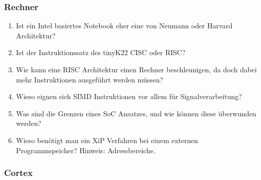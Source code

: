\documentclass[
  10pt,
  a4paper,
]{article}
\numberwithin{equation}{section}
\begin{document}
\hypertarget{rechner}{%
\subsubsection{Rechner}\label{rechner}}

\begin{enumerate}
\def\labelenumi{\arabic{enumi}.}
\item
  Ist ein Intel basiertes Notebook eher eine von Neumann oder Harvard
  Architektur?
\item
  Ist der Instruktionssatz des tinyK22 CISC oder RISC?
\item
  Wie kann eine RISC Architektur einen Rechner beschleunigen, da doch
  dabei mehr Instruktionen ausgeführt werden müssen?
\item
  Wieso eignen sich SIMD Instruktionen vor allem für Signalverarbeitung?
\item
  Was sind die Grenzen eines SoC Ansatzes, und wie können diese
  überwunden werden?
\item
  Wieso benötigt man ein XiP Verfahren bei einem externen
  Programmspeicher? Hinweis: Adressbereiche.
\end{enumerate}

\hypertarget{cortex}{%
\subsubsection{Cortex}\label{cortex}}
\end{document}
